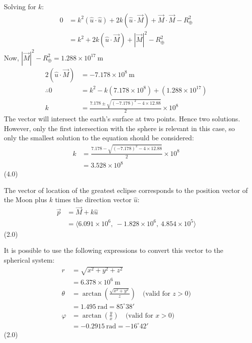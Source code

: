 \begin{description}
  Solving for $k$:
  \begin{align*}
    0 &= k^2 (\hat{u} \cdot \hat{u}) + 2k(\hat{u} \cdot \vec{M})
         + \vec{M} \cdot \vec{M} - R_\oplus^2\\
      &= k^2 + 2k(\hat{u} \cdot \vec{M}) + |\vec{M}|^2 - R_\oplus^2
  \end{align*}
  Now, $|\vec{M}|^2 - R_\oplus^2 = 1.288 \times 10^{17}\ \mathrm{m}$ %
  \begin{align*}
    2(\hat{u} \cdot \vec{M}) &= -7.178 \times 10^{8}\ \mathrm{m}\\
    \therefore 0 &= k^2 - k(7.178 \times 10^{8}) + (1.288 \times 10^{17})\\
    k &= \frac{7.178 \pm \sqrt{(-7.178)^2 - 4 \times 12.88}}{2} \times 10^{8}
  \end{align*}
  The vector will intersect the earth's surface at two points. Hence two
  solutions. However, only the first intersection with the sphere is relevant
  in this case, so only the smallest solution to the equation should be
  considered:
  \begin{align*}
    k &= \frac{7.178 - \sqrt{(-7.178)^2 - 4 \times 12.88}}{2} \times 10^{8}\\
      &= 3.528 \times 10^{8}
  \end{align*}
  \hfill(4.0)

  The vector of location of the greatest eclipse corresponds to the position
  vector of the Moon plus $k$ times the direction vector $\hat{u}$:
  \begin{align*}
    \vec{p} &= \vec{M} + k\hat{u}\\
      &= \langle 6.091 \times 10^{6},\ -1.828 \times 10^{6},\
                 4.854 \times 10^{5} \rangle
  \end{align*}
  \hfill(2.0)

  It is possible to use the following expressions to convert this vector to
  the spherical system:
  \begin{align*}
    r &= \sqrt{x^2 + y^2 + z^2}\\
      &= 6.378 \times 10^{6}\ \mathrm{m}\\
    \theta &= \arctan\left(\frac{\sqrt{x^2 + y^2}}{z}\right)
      \quad \text{(valid for } z > 0\text{)}\\
      &= 1.495\ \mathrm{rad} = 85^\circ 38'\\
    \varphi &= \arctan\left(\frac{y}{x}\right)
      \quad \text{(valid for } x > 0\text{)}\\
      &= -0.2915\ \mathrm{rad} = -16^\circ 42'
  \end{align*}
  \hfill(2.0)


\end{description}
